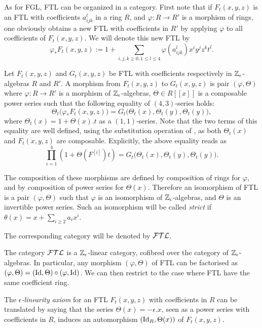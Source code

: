 \begin{num}
As for FGL, FTL can be organized in a category.
 First note that if $F_t(x,y,z)$ is an FTL with coefficients $a_{ijk}^l$ in a ring $R$,
 and $\varphi:R \rightarrow R'$ is a morphism of rings,
 one obviously obtains a new FTL with coefficients in $R'$ by applying $\varphi$ to all
 coefficients of $F_t(x,y,z)$. We will denote this new FTL by
$$
\varphi_*F_t(x,y,z):=1+\sum_{i,j,k\geq 0, 1 \leq l \leq 4} \varphi(a_{ijk}^l)x^iy^jz^kt^l.
$$
\end{num}
\begin{df}\label{df:morph_FTL}
Let $F_t(x,y,z)$ and $G_t(x,y,z)$ be FTL with coefficients respectively
 in $\mathbb{Z}_\epsilon$-algebras $R$ and $R'$. A morphism from $F_t(x,y,z)$ to $G_t(x,y,z)$ is pair $(\varphi,\Theta)$ where $\varphi:R \rightarrow R'$
 is a morphism of $\mathbb{Z}_\epsilon$-algebras,
 $\Theta \in R[[x]]$ is a composable power series such that
 the following equality of $(4,3)$-series holds:
$$
\Theta_t\big(\varphi_*F_t(x,y,z)\big)=G_t\big(\Theta_t(x),\Theta_t(y),\Theta_t(y)\big),
$$
where $\Theta_t(x)=1+\Theta(x).t$ as a $(1,1)$-series.
 Note that the two terms of this equality are well defined,
 using the substitution operation of ,
 as both $\Theta_t(x)$ and $F_t(x,y,z)$ are composable. Explicitly, the above equality reads as
 \[
 \prod_{i=1}^4(1+\Theta(F^{[i]})t)=G_t\big(\Theta_t(x),\Theta_t(y),\Theta_t(y)\big).
 \]

The composition of these morphisms are defined by composition of rings for $\varphi$,
 and by composition of power series for $\Theta(x)$.
 Therefore an isomorphism of FTL is a pair $(\varphi,\Theta)$ such that $\varphi$ is an isomorphism
 of $\mathbb{Z}_\epsilon$-algebras, and $\Theta$ is an invertible power series.
 Such an isomorphism will be called \emph{strict} if $\theta(x)=x+\sum_{i\geq 2}a_ix^i$.

The corresponding category will be denoted by $\mathcal{FTL}$.
\end{df}

\begin{rem}
The category $\mathcal{FTL}$ is a $\mathbb{Z}_\epsilon$-linear category, cofibred over the category of $\mathbb{Z}_\epsilon$-algebras.
In particular, any morphism $(\varphi,\Theta)$ of FTL can be factorised as
 $(\varphi,\Theta)=(\operatorname{Id},\Theta)\circ (\varphi,\operatorname{Id})$.
We can then restrict to the case where FTL have the same coefficient ring.
\end{rem}

\begin{ex}
The \emph{$\epsilon$-linearity axiom} for an FTL $F_t(x,y,z)$ with coefficients in $R$ 
 can be translated by saying that the series $\Theta(x)=-\epsilon.x$, seen as a power series
 with coefficients in $R$,
 induces an automorphism $(\operatorname{Id}_R,\Theta(x))$ of $F_t(x,y,z)$.
\end{ex}

